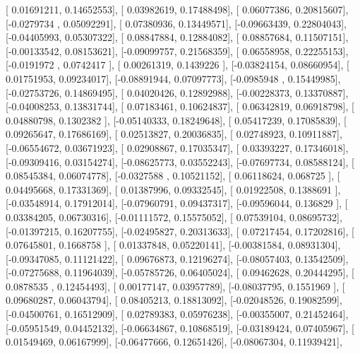 \documentclass{article}
\begin{document}
       [ 0.01691211,  0.14652553],
       [ 0.03982619,  0.17488498],
       [ 0.06077386,  0.20815607],
       [-0.0279734 ,  0.05092291],
       [ 0.07380936,  0.13449571],
       [-0.09663439,  0.22804043],
       [-0.04405993,  0.05307322],
       [ 0.08847884,  0.12884082],
       [ 0.08857684,  0.11507151],
       [-0.00133542,  0.08153621],
       [-0.09099757,  0.21568359],
       [ 0.06558958,  0.22255153],
       [-0.0191972 ,  0.0742417 ],
       [ 0.00261319,  0.1439226 ],
       [-0.03824154,  0.08660954],
       [ 0.01751953,  0.09234017],
       [-0.08891944,  0.07097773],
       [-0.0985948 ,  0.15449985],
       [-0.02753726,  0.14869495],
       [ 0.04020426,  0.12892988],
       [-0.00228373,  0.13370887],
       [-0.04008253,  0.13831744],
       [ 0.07183461,  0.10624837],
       [ 0.06342819,  0.06918798],
       [ 0.04880798,  0.1302382 ],
       [-0.05140333,  0.18249648],
       [ 0.05417239,  0.17085839],
       [ 0.09265647,  0.17686169],
       [ 0.02513827,  0.20036835],
       [ 0.02748923,  0.10911887],
       [-0.06554672,  0.03671923],
       [ 0.02908867,  0.17035347],
       [ 0.03393227,  0.17346018],
       [-0.09309416,  0.03154274],
       [-0.08625773,  0.03552243],
       [-0.07697734,  0.08588124],
       [ 0.08545384,  0.06074778],
       [-0.0327588 ,  0.10521152],
       [ 0.06118624,  0.068725  ],
       [ 0.04495668,  0.17331369],
       [ 0.01387996,  0.09332545],
       [ 0.01922508,  0.1388691 ],
       [-0.03548914,  0.17912014],
       [-0.07960791,  0.09437317],
       [-0.09596044,  0.136829  ],
       [ 0.03384205,  0.06730316],
       [-0.01111572,  0.15575052],
       [ 0.07539104,  0.08695732],
       [-0.01397215,  0.16207755],
       [-0.02495827,  0.20313633],
       [ 0.07217454,  0.17202816],
       [ 0.07645801,  0.1668758 ],
       [ 0.01337848,  0.05220141],
       [-0.00381584,  0.08931304],
       [-0.09347085,  0.11121422],
       [ 0.09676873,  0.12196274],
       [-0.08057403,  0.13542509],
       [-0.07275688,  0.11964039],
       [-0.05785726,  0.06405024],
       [ 0.09462628,  0.20444295],
       [ 0.0878535 ,  0.12454493],
       [ 0.00177147,  0.03957789],
       [-0.08037795,  0.1551969 ],
       [ 0.09680287,  0.06043794],
       [ 0.08405213,  0.18813092],
       [-0.02048526,  0.19082599],
       [-0.04500761,  0.16512909],
       [ 0.02789383,  0.05976238],
       [-0.00355007,  0.21452464],
       [-0.05951549,  0.04452132],
       [-0.06634867,  0.10868519],
       [-0.03189424,  0.07405967],
       [ 0.01549469,  0.06167999],
       [-0.06477666,  0.12651426],
       [-0.08067304,  0.11939421],
\end{document}
